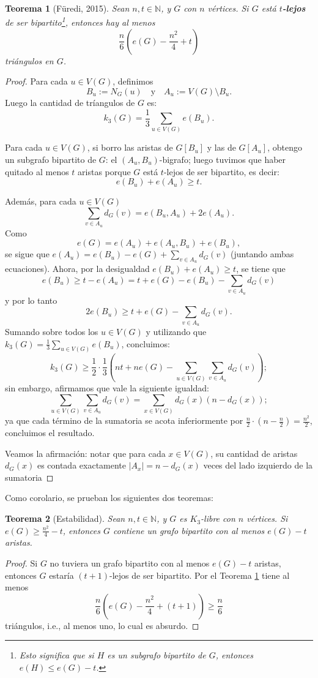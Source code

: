 \documentclass[12pt]{report}
\theoremstyle{plain}
\newtheorem{theorem}{Teorema}[section]
\theoremstyle{definition}
\newcommand{\naturals}{\mathbb{N}}
\newcommand{\abs}[1]{\left \vert #1 \right \vert}
\begin{document}
\begin{theorem}[Füredi, 2015]\label{th:teorema de furedi si G esta t lejos de ser bipartito entonces tiene triangulos}
Sean $n,t \in \naturals$, y $G$ con $n$ vértices. Si $G$ está \textbf{$t$-lejos} de ser bipartito\footnote{Esto significa que si $H$ es un subgrafo bipartito de $G$, entonces $e(H) \leq e(G)-t$.}, entonces hay al menos
\[
    \frac{n}{6} \left(e(G)-\frac{n^2}{4}+t\right)
\]
triángulos en $G$.
\end{theorem}
\begin{proof}
Para cada $u \in V(G)$, definimos
\[
    B_u := N_G (u) \quad \text{y} \quad A_u := V(G) \setminus B_u.
\]
Luego la cantidad de tríangulos de $G$ es:
\[
    k_3 (G) = \frac 1 3 \sum_{u \in V(G)} e(B_u).
\]

Para cada $u \in V(G)$, si borro las aristas de $G[B_u]$ y las de $G[A_u]$, obtengo un subgrafo bipartito de $G$: el $(A_u,B_u)$-bigrafo; luego tuvimos que haber quitado al menos $t$ aristas porque $G$ está $t$-lejos de ser bipartito, es decir:
\[
    e(B_u) + e(A_u) \geq t.
\]

Además, para cada $u \in V(G)$
\[
    \sum_{v \in A_u} d_G (v) = e(B_u, A_u) + 2e (A_u).
\]
Como
\[
    e(G) = e(A_u) + e(A_u, B_u) + e(B_u),
\]
se sigue que $e (A_u) = e(B_u) - e(G) + \sum_{v \in A_u} d_G (v)$ (juntando ambas ecuaciones). Ahora, por la desigualdad $e(B_u) + e (A_u)\geq t$, se tiene que
\[
    e(B_u) \geq t - e(A_u) = t +e(G) - e(B_u) - \sum_{v \in A_u} d_G (v)
\]
y por lo tanto
\[
    2 e(B_u) \geq t + e(G) - \sum_{v \in A_u} d_G (v).
\]
Sumando sobre todos los $u \in V(G)$ y utilizando que $k_3 (G) = \frac 1 3 \sum_{u \in V(G)} e (B_u)$, concluimos:
\[
    k_3 (G) \geq \frac 1 2 \cdot \frac 1 3 (n t + n e(G) - \sum_{u \in V(G) } \sum_{v \in A_u} d_G (v));
\]
sin embargo, afirmamos que vale la siguiente igualdad:
\[
    \sum_{u \in V(G)} \sum_{v \in A_u} d_G (v) = \sum_{x \in V(G)} d_G (x) ( n - d_G (x));
\]
ya que cada término de la sumatoria se acota inferiormente por $\frac n 2  \cdot (n - \frac n 2) = \frac{n^2}{2}$, concluimos el resultado.

Veamos la afirmación: notar que para cada $x \in V(G)$, su cantidad de aristas $d_G (x)$ es contada exactamente $\abs {A_x} = n - d_G (x)$ veces del lado izquierdo de la sumatoria
\end{proof}

Como corolario, se prueban los siguientes dos teoremas:
\begin{theorem}[Estabilidad]
Sean $n,t \in \naturals$, y $G$ es $K_3$-libre con $n$ vértices. Si $e(G) \geq \frac{n^2}{4}- t$, entonces $G$ contiene un grafo bipartito con al menos $e(G)-t$ aristas.
\end{theorem}
\begin{proof}
Si $G$ no tuviera un grafo bipartito con al menos $e(G) - t$ aristas, entonces $G$ estaría $(t+1)$-lejos de ser bipartito. Por el Teorema \ref{th:teorema de furedi si G esta t lejos de ser bipartito entonces tiene triangulos} tiene al menos
\[
    \frac{n}{6} \left ( e(G) - \frac{n^2}{4} + (t + 1) \right ) \geq \frac n 6
\]
triángulos, i.e., al menos uno, lo cual es absurdo.
\end{proof}
\end{document}
